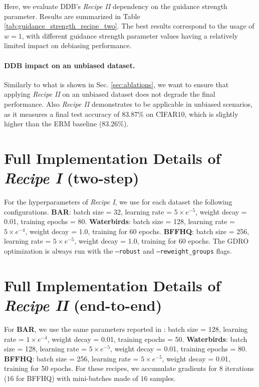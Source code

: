 Here, we evaluate DDB's \textit{Recipe II} dependency on the guidance strength parameter. Results are summarized in Table \ref{tab:guidance_strength_recipe_two}. The best results correspond to the usage of $w=1$, with different guidance strength parameter values having a relatively limited impact on debiasing performance. 

\paragraph{DDB impact on an unbiased dataset. }
Similarly to what is shown in Sec. \ref{sec:ablations}, we want to ensure that applying \textit{Recipe II} on an unbiased dataset does not degrade the final performance. Also \textit{Recipe II} demonstrates to be applicable in unbiased scenarios, as it measures a final test accuracy of $83.87 \%$ on CIFAR10, which is slightly higher than the ERM baseline ($83.26 \%$).
\section{Full Implementation Details of \textit{Recipe I} (two-step)}
For the hyperparameters of \textit{Recipe I}, we use for each dataset the following configurations. \textbf{BAR}: batch size = 32, learning rate = $5 \times e^{-5}$, weight decay = 0.01, training epochs = 80. 
\textbf{Waterbirds}: batch size = 128, learning rate = $5 \times e^{-4}$, weight decay = 1.0, training for 60 epochs. \textbf{BFFHQ}: batch size = 256, learning rate = $5 \times e^{-5}$, weight decay = 1.0, training for 60 epochs. The GDRO optimization is always run with the \texttt{--robust} and \texttt{--reweight\_groups} flags. 
\section{Full Implementation Details of \textit{Recipe II} (end-to-end)}
For \textbf{BAR}, we use the same parameters reported in \cite{nam2020learning}: batch size = 128, learning rate = $1 \times e^{-4}$, weight decay = 0.01, training epochs = 50. 
\textbf{Waterbirds}: batch size = 128, learning rate = $5 \times e^{-5}$, weight decay = 0.01, training epochs = 80. \textbf{BFFHQ}: batch size = 256, learning rate = $5 \times e^{-5}$, weight decay = 0.01, training for 50 epochs.
For these recipes, we accumulate gradients for $8$ iterations ($16$ for BFFHQ) with mini-batches made of $16$ samples.  

